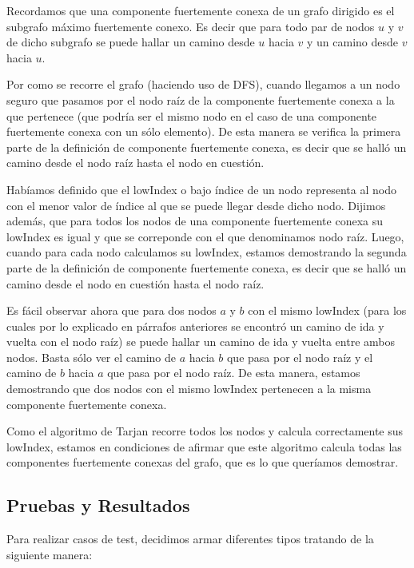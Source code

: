 \quad Recordamos que una componente fuertemente conexa de un grafo dirigido es el subgrafo máximo fuertemente conexo. Es decir que para todo par de nodos $u$ y $v$ de dicho subgrafo se puede hallar un camino desde $u$ hacia $v$ y un camino desde $v$ hacia $u$.

\quad Por como se recorre el grafo (haciendo uso de DFS), cuando llegamos a un nodo seguro que pasamos por el nodo raíz de la componente fuertemente conexa a la que pertenece (que podría ser el mismo nodo en el caso de una componente fuertemente conexa con un sólo elemento). De esta manera se verifica la primera parte de la definición de componente fuertemente conexa, es decir que se halló un camino desde el nodo raíz hasta el nodo en cuestión.

\quad Habíamos definido que el lowIndex o bajo índice de un nodo representa al nodo con el menor valor de índice al que  se puede llegar desde dicho nodo. Dijimos además, que para todos los nodos de una componente fuertemente conexa su lowIndex es igual y que se correponde con el que denominamos nodo raíz. Luego, cuando para cada nodo calculamos su lowIndex, estamos demostrando la segunda parte de la definición de componente fuertemente conexa, es decir que se halló un camino desde el nodo en cuestión hasta el nodo raíz.

\quad Es fácil observar ahora que para dos nodos $a$ y $b$ con el mismo lowIndex (para los cuales por lo explicado en párrafos anteriores se encontró un camino de ida y vuelta con el nodo raíz) se puede hallar un camino de ida y vuelta entre ambos nodos. Basta sólo ver el camino de $a$ hacia $b$ que pasa por el nodo raíz y el camino de $b$ hacia $a$ que pasa por el nodo raíz. De esta manera, estamos demostrando que dos nodos con el mismo lowIndex pertenecen a la misma componente fuertemente conexa.

\quad Como el algoritmo de Tarjan recorre todos los nodos y calcula correctamente sus lowIndex, estamos en condiciones de afirmar que este algoritmo calcula todas las componentes fuertemente conexas del grafo, que es lo que queríamos demostrar.

\subsection{Pruebas y Resultados}


\quad Para realizar casos de test, decidimos armar diferentes tipos tratando de la siguiente manera:

